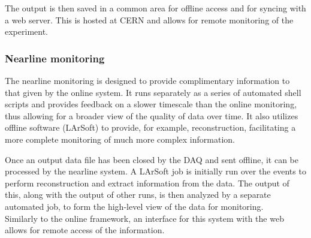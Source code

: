 The output is then saved in a common area for offline access and for syncing
with a web server. This is hosted at CERN and allows for remote
monitoring of the experiment.

\subsubsection{Nearline monitoring}

The nearline monitoring is designed to provide complimentary information to
that given by the online system. It runs separately as a series of automated
shell scripts and provides feedback on a slower timescale than the online
monitoring, thus allowing for a broader view of the quality of data over time.
It also utilizes offline software (LArSoft) to provide, for example,
reconstruction, facilitating a more complete monitoring of much more complex
information.

Once an output data file has been closed by the DAQ and sent offline, it can be processed by the
nearline system.  A LArSoft job is initially run over the events to perform
reconstruction and extract information from the data.  The output of this,
along with the output of other runs, is then analyzed by a separate automated
job, to form the high-level view of the data for monitoring.\\
%
Similarly to the online framework, %
an interface for this system
with the web allows for remote access of the information.


